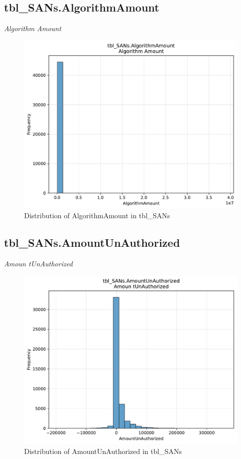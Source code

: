 \subsection{tbl\_SANs.AlgorithmAmount}
\textit{Algorithm Amount}

\begin{figure}[htbp]
\centering
\includegraphics[width=\textwidth]{figures/dbo_tbl_SANs_AlgorithmAmount.pdf}
\caption{Distribution of AlgorithmAmount in tbl\_SANs}
\end{figure}\newpage

\subsection{tbl\_SANs.AmountUnAuthorized}
\textit{Amoun tUnAuthorized}

\begin{figure}[htbp]
\centering
\includegraphics[width=\textwidth]{figures/dbo_tbl_SANs_AmountUnAuthorized.pdf}
\caption{Distribution of AmountUnAuthorized in tbl\_SANs}
\end{figure}\newpage

